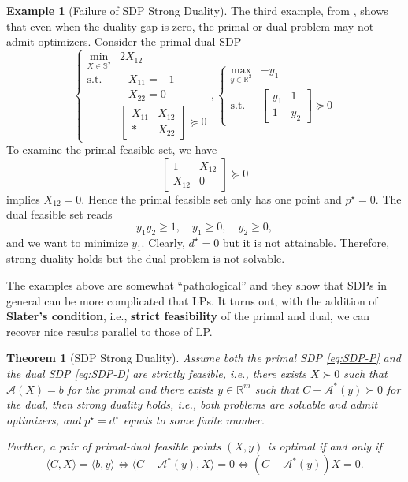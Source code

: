 \documentclass[
]{book}
\newtheorem{theorem}{Theorem}[chapter]
\theoremstyle{definition}
\theoremstyle{definition}
\newtheorem{example}{Example}[chapter]
\theoremstyle{definition}
\theoremstyle{definition}
\theoremstyle{remark}
\begin{document}
\begin{example}[Failure of SDP Strong Duality]
The third example, from \citep{todd01an-semidefinite}, shows that even when the duality gap is zero, the primal or dual problem may not admit optimizers. Consider the primal-dual SDP
\[
\begin{cases}
\min_{X \in \mathbb{S}^{2}} & 2 X_{12} \\
\mathrm{s.t.}& - X_{11} = -1 \\
& - X_{22} = 0 \\
& \begin{bmatrix} X_{11} & X_{12} \\ * & X_{22} \end{bmatrix} \succeq 0 
\end{cases},
\begin{cases}
\max_{y \in \mathbb{R}^{2}} & - y_1 \\
\mathrm{s.t.}& \begin{bmatrix} y_1 & 1 \\ 1 & y_2 \end{bmatrix} \succeq 0
\end{cases}
\]
To examine the primal feasible set, we have
\[
\begin{bmatrix} 1 & X_{12} \\ X_{12} & 0 \end{bmatrix} \succeq 0
\]
implies \(X_{12} = 0\). Hence the primal feasible set only has one point and \(p^\star = 0\). The dual feasible set reads
\[
y_1 y_2 \geq 1,\quad  y_1 \geq 0, \quad y_2 \geq 0,
\]
and we want to minimize \(y_1\). Clearly, \(d^\star = 0\) but it is not attainable. Therefore, strong duality holds but the dual problem is not solvable.
\end{example}

The examples above are somewhat ``pathological'' and they show that SDPs in general can be more complicated that LPs. It turns out, with the addition of \textbf{Slater's condition}, i.e., \textbf{strict feasibility} of the primal and dual, we can recover nice results parallel to those of LP.

\begin{theorem}[SDP Strong Duality]
\protect\hypertarget{thm:SDPStrongDuality}{}\label{thm:SDPStrongDuality}Assume both the primal SDP \eqref{eq:SDP-P} and the dual SDP \eqref{eq:SDP-D} are \emph{strictly feasible}, i.e., there exists \(X \succ 0\) such that \(\mathcal{A}(X)=b\) for the primal and there exists \(y \in \mathbb{R}^{m}\) such that \(C - \mathcal{A}^* (y) \succ 0\) for the dual, then strong duality holds, i.e., both problems are solvable and admit optimizers, and \(p^\star = d^\star\) equals to some finite number.

Further, a pair of primal-dual feasible points \((X,y)\) is optimal if and only if
\[
\langle C, X \rangle = \langle b, y \rangle \Leftrightarrow \langle C - \mathcal{A}^* (y), X \rangle = 0 \Leftrightarrow (C - \mathcal{A}^* (y)) X = 0.
\]
\end{theorem}
\end{document}
